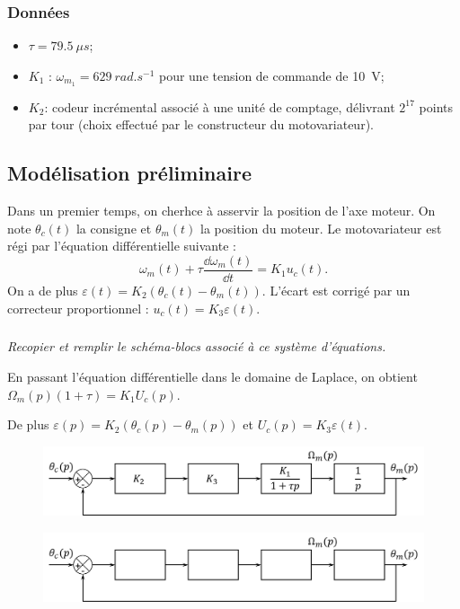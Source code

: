 \documentclass[10pt,fleqn]{article} %
\begin{document}
\subsubsection*{Données}
\begin{itemize}
\item $\tau = \SI{79,5}{\mu s}$;
\item $K_1$ : $\omega_{m_1}=\SI{629}{rad.s^{-1}}$ pour une tension de commande de \SI{10}{V};
\item $K_2$: codeur incrémental associé à une unité de comptage, délivrant $2^{17}$ points par tour (choix effectué par le constructeur du motovariateur).
\end{itemize}

\fi

\subsection{Modélisation préliminaire}

Dans un premier temps, on cherhce à asservir la position de l'axe moteur. On note $\theta_c(t)$ la consigne et  $\theta_m(t)$ la position du moteur. Le motovariateur est régi par l'équation différentielle suivante : 
$$ \omega_{m}(t)+\tau  \dfrac{\dd  \omega_{m}(t)}{ \dd t}= {K_1} u_{c}(t). $$ On a de plus $\varepsilon(t) = K_2 \left(\theta_c(t)-\theta_m(t)\right)$. L'écart est corrigé par un correcteur proportionnel : $ u_{c}(t) = K_3\varepsilon(t)$.

\subparagraph{\label{q}}\textit{Recopier et remplir le schéma-blocs associé à ce système d'équations.}
\ifprof
\begin{corrige}
En passant l'équation différentielle dans le domaine de Laplace, on obtient $\Omega_m(p)\left(1+\tau\right)=K_1 U_c(p)$.

De plus $\varepsilon(p) = K_2 \left(\theta_c(p)-\theta_m(p)\right)$ et $ U_{c}(p) = K_3\varepsilon(t)$.



\begin{figure}[H]
\centering
\includegraphics[width=0.9\linewidth]{fig_11}
\end{figure}
\end{corrige}
\else


\begin{figure}[H]
\centering
\includegraphics[width=0.9\linewidth]{fig_10}
\end{figure}
\fi
\end{document}
